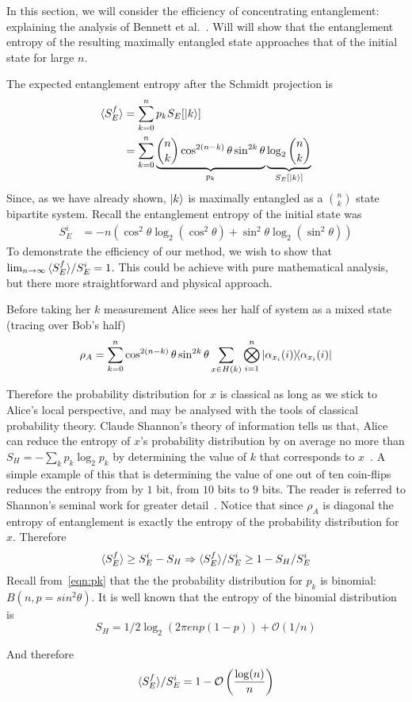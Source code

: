 In this section, we will consider the efficiency of concentrating entanglement: explaining the analysis of Bennett et al.~\cite{bennett1996concentrating}.
Will will show that the entanglement entropy of the resulting maximally entangled state approaches that of the initial state for large $n$.

The expected entanglement entropy after the Schmidt projection is
\begin{align*}
{\langle S_E^f \rangle} &= \sum_{k=0}^n p_k S_E[\ket{k}] \\
&=\sum_{k=0}^n \underbrace{\binom{n}{k} \cos^{2(n-k)}\theta \sin^{2k}\theta}_{p_k}
 \underbrace{\log_2 \binom{n}{k}}_{S_E[\ket{k}]}
\end{align*}
Since, as we have already shown, $\ket{k}$ is maximally entangled as a $\binom{n}{k}$ state bipartite system.
Recall the entanglement entropy of the initial state was
\begin{align*}
S_{E}^i &= -n \left( \cos^2\theta \log_2 \left(\cos^2\theta \right)
+ \sin^2\theta \log_2 \left(\sin^2\theta \right)\right)
\end{align*}
To demonstrate the efficiency of our method, we wish to show that \\$\lim_{n \rightarrow \infty}  {\langle S_E^f \rangle} / S_E^i  = 1$.
This could be achieve with pure mathematical analysis, but there more straightforward and physical approach.

Before taking her $k$ measurement Alice sees her half of system as a mixed state (tracing over Bob's half)
\begin{align*}
\rho_A = \sum_{k=0}^n \cos^{2(n-k)}\theta \sin^{2k}\theta
\sum_{x \in H(k)} \bigotimes_{i=1}^n 
\dyad{\alpha_{x_i}(i)}{\alpha_{x_i}(i)}
\end{align*}

Therefore the probability distribution for $x$ is classical as long as we stick to Alice's local perspective, and may be analysed with the tools of classical probability theory.
Claude Shannon's theory of information tells us that, Alice can reduce the entropy of $x$'s probability distribution  by on average no more than $S_H = - \sum_k p_k \log_2 p_k$ by determining the value of $k$ that corresponds to $x$~\cite{shannon2001communication}. A simple example of this that is determining the value of one out of ten coin-flips reduces the entropy from by $1$ bit, from $10$ bits to $9$ bits. The reader is referred to Shannon's seminal work for greater detail~\cite{shannon2001communication}.
Notice that since $\rho_A$ is diagonal the entropy of entanglement is exactly the entropy of the probability distribution for $x$.
Therefore
$$
{\langle S_E^f \rangle} \ge S_E^i - S_H \Rightarrow {\langle S_E^f \rangle} / S_E^i \ge 1 - S_H /S_E^i 
$$
Recall from~\eqref{eqn:pk} that the the probability distribution for $p_k$ is binomial: $B(n, p=sin^2\theta)$.
It is well known that the entropy of the binomial distribution is
$$S_H = 1/2 \log_2 \left(2 \pi e n p (1-p)\right) + \mathcal{O}(1/n)$$

And therefore 
$$
{\langle S_E^f \rangle} / S_E^i = 1 - \mathcal{O}\left(\frac{\log(n)}{n}\right)
$$


